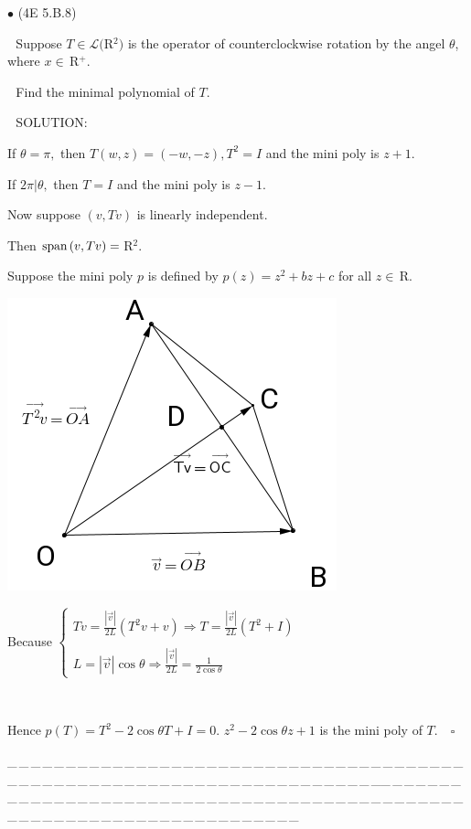\documentclass[a4paper, 11pt, UTF8]{article}
\def\Spn{\textup{span}\,}
\def\Lm{\mathcal{L}}
\def\Rbfc{$\,{\timesbf R}$}
\begin{document}
\begin{large}
{\small $\bullet$} (\normalsize{4E 5.B.8})\par\,\, {\timessl\Large 
Suppose $T\in\Lm(${\timesbf R}$^2)$ is the operator of counterclockwise rotation by the angel $\theta$, where $x\in\Rbfc^+$.}\par\,\,
{\timessl\Large Find the minimal polynomial of $T$.}\par\,\,
{\timesbf S\footnotesize{OLUTION:}}\par\quad
If $\theta=\pi,$ then $T(w,z)=(-w,-z),T^2=I$ and the mini poly is $z+1.$\par\quad
If $2\pi|\theta,$ then $T=I$ and the mini poly is $z-1.$\par\quad
Now suppose $(v,Tv)$ is linearly independent.\par\quad
Then $\Spn(v,Tv)=\Rbfc^2.$\par\quad
{\tiny {\large Suppose the mini poly $p$ is defined by $p(z)=z^2+bz+c$ for all $z\in\Rbfc.$}\par\quad
 \includegraphics[scale=0.25]{./diagram.png}}\quad
Because $\left\{\begin{array}{l}Tv=\displaystyle\frac{|\overset{\rightarrow}{v}|}{2L}(T^2 v+v)\Rightarrow T=\frac{|\overset{\rightarrow}{v}|}{2L}(T^2+I)\\\\ L=|\overset{\rightarrow}{v}|\cos\theta\Rightarrow\frac{|\overset{\rightarrow}{v}|}{2L}=\frac{1}{2\cos\theta} \end{array}\right.$\par{\tiny\,\par}\quad
Hence $p(T)=T^2-2\cos\theta T+I=0.$ $z^2-2\cos\theta z+1$ is the mini poly of $T.\quad\square$\par
{\tiny \_\,\_\,\_\,\_\,\_\,\_\,\_\,\_\,\_\,\_\,\_\,\_\,\_\,\_\,\_\,\_\,\_\,\_\,\_\,\_\,\_\,\_\,\_\,\_\,\_\,\_\,\_\,\_\,\_\,\_\,\_\,\_\,\_\,\_\,\_\,\_\,\_\,\_\,\_\,\_\,\_\,\_\,\_\,\_\,\_\,\_\,\_\,\_\,\_\,\_\,\_\,\_\,\_\,\_\,\_\,\_\,\_\,\_\,\_\,\_\,\_\,\_\,\_\,\_\,\_\,\_\,\_\,\_\,\_\,\_\,\_\_\,\_\,\_\,\_\,\_\,\_\,\_\,\_\,\_\,\_\,\_\,\_\,\_\,\_\,\_\,\_\,\_\,\_\,\_\,\_\,\_\,\_\,\_\,\_\,\_\,\_\,\_\,\_\,\_\,\_\,\_\,\_\,\_\,\_\,\_\,\_\,\_\,\_\,\_\,\_\,\_\,\_\,\_\,\_\,\_\,\_\,\_\,\_\,\_\,\_\,\_\,\_\,\_\,\_\,\_\,\_\,\_\,\_\,\_\,\_\,\_\,\_\,\_\,\_\,\_\,\_\,\_\,\_\,\_\,\_\,\_}\par


\end{large}
\end{document}
